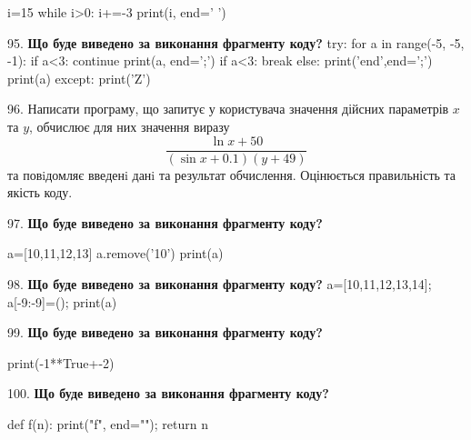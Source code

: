 \documentclass[11pt]{article}
\begin{document}
i=15
while i>0:
    i+=-3
print(i, end=' ')

\par\vspace{5mm}
95. \textbf{Що буде виведено за виконання фрагменту коду?}
try:
    for a in range(-5, -5, -1):
        if a<3:
            continue
        print(a, end=';')
        if a<3:
            break
    else:
        print('end',end=';')
    print(a)
except:
    print('Z')
\par\vspace{5mm}
96. 
Написати програму, що запитує у користувача значення дійсних параметрів $x$ та $y$, обчислює для них значення виразу 
$$\frac{\ln x + 50}{(\sin x + 0.1) (y + 49)}$$ 
та повiдомляє введенi данi та результат обчислення.
 Оцінюється правильність та якість коду.

\par\vspace{5mm}
97. \textbf{Що буде виведено за виконання фрагменту коду?}

a=[10,11,12,13]
a.remove('10')
print(a)

\par\vspace{5mm}
98. \textbf{Що буде виведено за виконання фрагменту коду?}
a=[10,11,12,13,14]; a[-9:-9]=(); print(a)\par\vspace{5mm}
99. \textbf{Що буде виведено за виконання фрагменту коду?}

print(-1**True+-2)
\par\vspace{5mm}
100. \textbf{Що буде виведено за виконання фрагменту коду?}

def f(n):
    print("f", end="");
    return n
\end{document}
